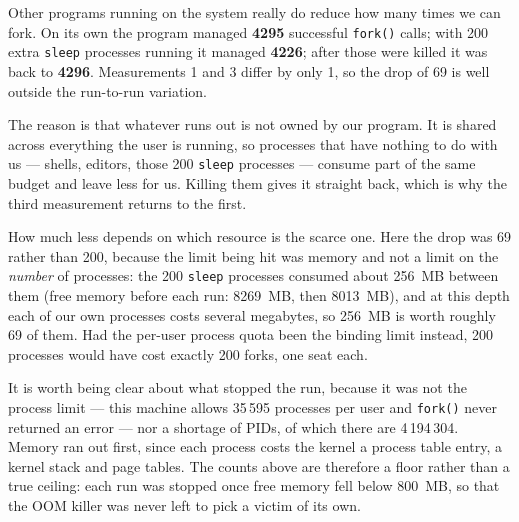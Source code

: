 
Other programs running on the system really do reduce how many times we can
fork. On its own the program managed \textbf{4295} successful \texttt{fork()}
calls; with 200 extra \texttt{sleep} processes running it managed \textbf{4226};
after those were killed it was back to \textbf{4296}. Measurements 1 and 3 differ
by only 1, so the drop of 69 is well outside the run-to-run variation.

The reason is that whatever runs out is not owned by our program. It is shared
across everything the user is running, so processes that have nothing to do with
us --- shells, editors, those 200 \texttt{sleep} processes --- consume part of the
same budget and leave less for us. Killing them gives it straight back, which is
why the third measurement returns to the first.

How much less depends on which resource is the scarce one. Here the drop was 69
rather than 200, because the limit being hit was memory and not a limit on the
\emph{number} of processes: the 200 \texttt{sleep} processes consumed about
256~MB between them (free memory before each run: 8269~MB, then 8013~MB), and at
this depth each of our own processes costs several megabytes, so 256~MB is worth
roughly 69 of them. Had the per-user process quota been the binding limit
instead, 200 processes would have cost exactly 200 forks, one seat each.

It is worth being clear about what stopped the run, because it was not the
process limit --- this machine allows 35\,595 processes per user and
\texttt{fork()} never returned an error --- nor a shortage of PIDs, of which there
are 4\,194\,304. Memory ran out first, since each process costs the kernel a
process table entry, a kernel stack and page tables. The counts above are
therefore a floor rather than a true ceiling: each run was stopped once free
memory fell below 800~MB, so that the OOM killer was never left to pick a victim
of its own.
